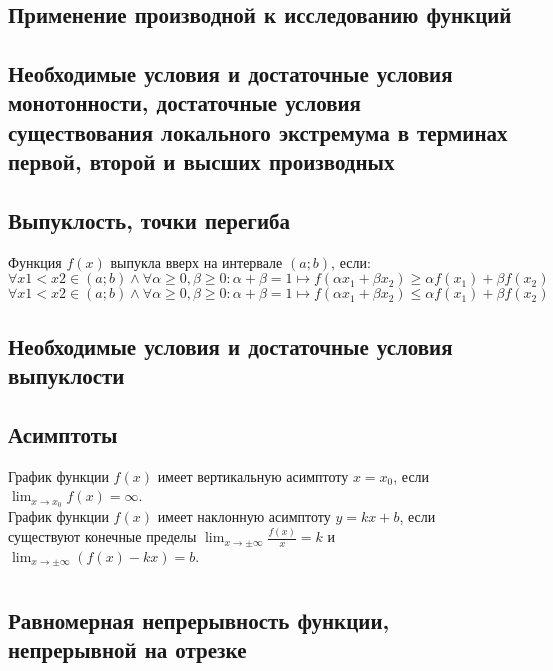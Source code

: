 \documentclass{article}
\newcommand{\intr}[2]{$(#1;#2)$}
\begin{document}
    \newpage

    \section{}
    \subsection*{Применение производной к исследованию функций}
    \subsection*{Необходимые условия и достаточные условия монотонности, достаточные условия существования локального экстремума в терминах первой, второй и высших производных}
    \subsection*{Выпуклость, точки перегиба}
        Функция $f(x)$ выпукла вверх на интервале \intr{a}{b}, если:
        \[ \forall x1 < x2 \in (a;b) \land \forall \alpha \ge 0, \beta \ge 0: \alpha + \beta = 1 \longmapsto f(\alpha x_1 + \beta x_2) \ge \alpha f(x_1) + \beta f(x_2) \]
        \[ \forall x1 < x2 \in (a;b) \land \forall \alpha \ge 0, \beta \ge 0: \alpha + \beta = 1 \longmapsto f(\alpha x_1 + \beta x_2) \le \alpha f(x_1) + \beta f(x_2) \]
        
    \subsection*{Необходимые условия и достаточные условия выпуклости}
    \subsection*{Асимптоты}
        График функции $ f(x)$ имеет вертикальную асимптоту $x = x_0$, если $ \lim_{x \to x_0} f(x) = \infty $.
        \\
        График функции $ f(x)$ имеет наклонную асимптоту $y = kx + b$, если существуют конечные пределы
        $ \lim_{x \to \pm \infty} \frac{f(x)}{x} = k $ и $ \lim_{x \to \pm \infty} \left( f(x) - kx \right) = b $.


    \newpage
    
    \section{}
    \subsection*{Равномерная непрерывность функции, непрерывной на отрезке}
\end{document}
